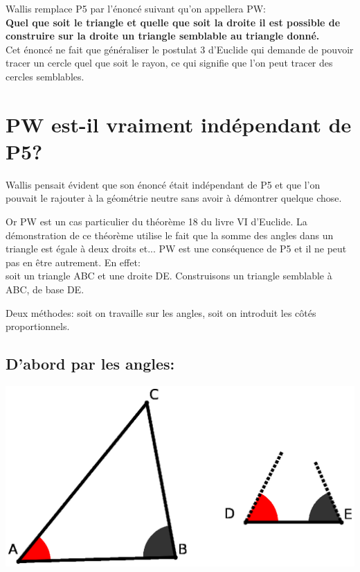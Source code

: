 \documentclass[a4paper, 12pt, twoside]{book}
\begin{document}
 Wallis remplace P5 par l'énoncé suivant qu'on appellera PW:\\
 
 \textbf{ Quel que soit le triangle et quelle que soit la droite il est possible de construire sur la droite un triangle semblable au triangle donné.}\\
 
 Cet énoncé ne fait que généraliser le postulat 3 d'Euclide qui demande de pouvoir tracer un cercle quel que soit le rayon, ce qui signifie que l'on peut tracer des cercles semblables.\
 \section{PW est-il vraiment indépendant de P5?}
 
  
 Wallis pensait évident que son énoncé était indépendant de P5 et que l'on pouvait le rajouter à la géométrie neutre sans avoir à démontrer quelque chose.\
 
 Or PW est un cas particulier du théorème 18 du livre VI d'Euclide. La démonstration de ce théorème utilise le fait que la somme des angles dans un triangle est égale à deux droits  et... PW est une conséquence de P5 et il ne peut pas en être autrement. En effet:\\
 
  soit un triangle ABC et une droite DE. Construisons un triangle semblable à ABC, de base DE. \
  
  Deux méthodes: soit on travaille sur les angles, soit on introduit  les côtés proportionnels.\
  
 \subsection{ D'abord par les angles:}
  
  
\includegraphics[scale=0.7]{figures/WALLIS1.eps} \\
\end{document}
